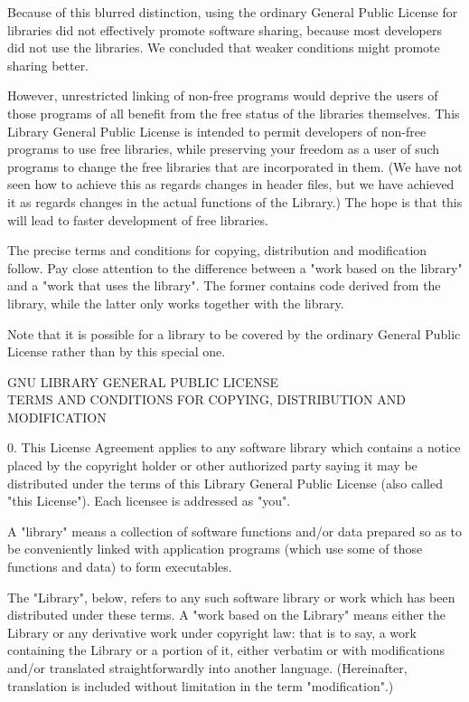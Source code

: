 \documentclass[a4paper,11pt]{report}
\begin{document}
Because of this blurred distinction, using the ordinary General
Public License for libraries did not effectively promote software
sharing, because most developers did not use the libraries. We
concluded that weaker conditions might promote sharing better.

However, unrestricted linking of non-free programs would deprive the
users of those programs of all benefit from the free status of the
libraries themselves. This Library General Public License is intended to
permit developers of non-free programs to use free libraries, while
preserving your freedom as a user of such programs to change the free
libraries that are incorporated in them. (We have not seen how to achieve
this as regards changes in header files, but we have achieved it as regards
changes in the actual functions of the Library.) The hope is that this
will lead to faster development of free libraries.

The precise terms and conditions for copying, distribution and
modification follow. Pay close attention to the difference between a
"work based on the library" and a "work that uses the library". The
former contains code derived from the library, while the latter only
works together with the library.

Note that it is possible for a library to be covered by the ordinary
General Public License rather than by this special one.

\begin{center}
		GNU LIBRARY GENERAL PUBLIC LICENSE\\
 TERMS AND CONDITIONS FOR COPYING, DISTRIBUTION AND MODIFICATION
\end{center}

0. This License Agreement applies to any software library which
contains a notice placed by the copyright holder or other authorized
party saying it may be distributed under the terms of this Library
General Public License (also called "this License"). Each licensee is
addressed as "you".

A "library" means a collection of software functions and/or data
prepared so as to be conveniently linked with application programs
(which use some of those functions and data) to form executables.

The "Library", below, refers to any such software library or work
which has been distributed under these terms. A "work based on the
Library" means either the Library or any derivative work under
copyright law: that is to say, a work containing the Library or a
portion of it, either verbatim or with modifications and/or translated
straightforwardly into another language. (Hereinafter, translation is
included without limitation in the term "modification".)
\end{document}

